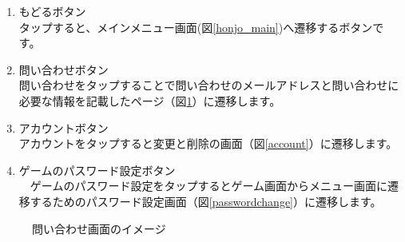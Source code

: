 \documentclass[a4j]{jarticle}
\begin{document}
\begin{enumerate}
  \renewcommand{\labelenumi}{\textcircled{\scriptsize \theenumi}}
\item もどるボタン\\
  タップすると、メインメニュー画面(図\ref{honjo_main})へ遷移するボタンです。
\item 問い合わせボタン\\
  問い合わせをタップすることで問い合わせのメールアドレスと問い合わせに必要な情報を記載したページ（図\ref{inquiry}）に遷移します。
\item アカウントボタン\\
  アカウントをタップすると変更と削除の画面（図\ref{account}）に遷移します。
\item ゲームのパスワード設定ボタン\\
　ゲームのパスワード設定をタップするとゲーム画面からメニュー画面に遷移するためのパスワード設定画面（図\ref{passwordchange}）に遷移します。
\end{enumerate}

\begin{figure}[H]
    \begin{center}
    \caption {問い合わせ画面のイメージ}
    \label{inquiry}
    \end{center}
\end{figure}
\end{document}
